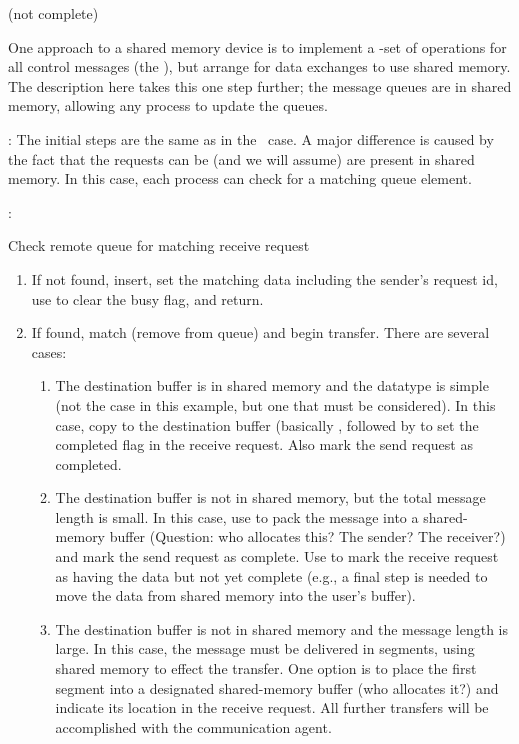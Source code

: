\begin{mmadi}
\begin{shmem}
(not complete)

One approach to a shared memory device is to implement a \tcpname-set of
operations for all control messages (the ), but
arrange for data exchanges to use shared memory.  The description here takes
this one step further; the message queues are in shared memory, allowing any
process to update the queues.

:
The initial steps are the same as in the \tcpname\ case.  A major difference
is caused by the fact that the requests can be (and we will assume) are
present in shared memory.  In this case, each process can check for a matching
queue element.


:

Check remote queue for matching receive request
\begin{enumerate}
\item If not found, insert, set the matching data including the sender's
  request id, use  to clear the busy flag, and
  return. 
\item If found, match (remove from queue) and begin transfer.  There are
  several cases:
    \begin{enumerate}
    \item The destination buffer is in shared memory and the datatype is
      simple (not the case in this example, but one that must be considered). 
      In this case, copy to the destination buffer (basically
      , followed by  to set
      the completed flag in the receive request.  Also mark the send request
      as completed.
    \item The destination buffer is not in shared memory, but the total
      message length is small.  In this case, use  to pack
      the message into a shared-memory buffer (Question: who allocates this?
      The sender?  The receiver?) and mark the send request as complete.
      Use  to mark the receive request as having
      the data but not yet complete (e.g., a final step is needed to move the
      data from shared memory into the user's buffer).
    \item The destination buffer is not in shared memory and the message
      length is large.  In this case, the message must be delivered in
      segments, using shared memory to effect the transfer.  One option is to
      place the first segment into a designated shared-memory buffer (who
      allocates it?) and indicate its location in the receive request.  All
      further transfers will be accomplished with the communication agent.
    \end{enumerate}
\end{enumerate}


\end{shmem}
\end{mmadi}
